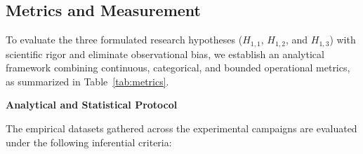 \subsection{Metrics and Measurement}
\label{sec:metrics}

To evaluate the three formulated research hypotheses ($H_{1,1}$, $H_{1,2}$, and $H_{1,3}$) with scientific rigor and eliminate observational bias, we establish an analytical framework combining continuous, categorical, and bounded operational metrics, as summarized in Table~\ref{tab:metrics}.



\textbf{Analytical and Statistical Protocol}

The empirical datasets gathered across the experimental campaigns are evaluated under the following inferential criteria:
